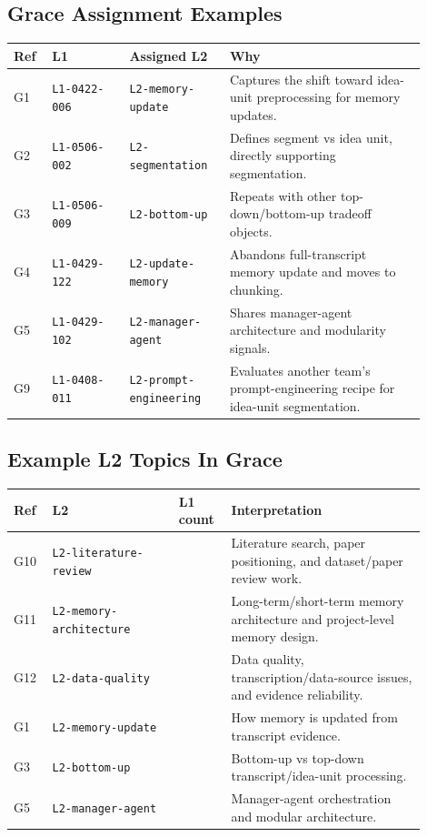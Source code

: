 \documentclass[11pt,a4paper]{article}
\newcommand{\code}[1]{{\footnotesize\texttt{#1}}}
\begin{document}
\subsection{Grace Assignment Examples}

\begin{longtable}{>{\raggedright\arraybackslash}p{0.08\linewidth}>{\raggedright\arraybackslash}p{0.17\linewidth}>{\raggedright\arraybackslash}p{0.22\linewidth}>{\raggedright\arraybackslash}p{0.43\linewidth}}
\textbf{Ref} & \textbf{L1} & \textbf{Assigned L2} & \textbf{Why} \\
\hline
G1 & \code{L1-0422-006} & \code{L2-memory-update} & Captures the shift toward idea-unit preprocessing for memory updates. \\
G2 & \code{L1-0506-002} & \code{L2-segmentation} & Defines segment vs idea unit, directly supporting segmentation. \\
G3 & \code{L1-0506-009} & \code{L2-bottom-up} & Repeats with other top-down/bottom-up tradeoff objects. \\
G4 & \code{L1-0429-122} & \code{L2-update-memory} & Abandons full-transcript memory update and moves to chunking. \\
G5 & \code{L1-0429-102} & \code{L2-manager-agent} & Shares manager-agent architecture and modularity signals. \\
G9 & \code{L1-0408-011} & \code{L2-prompt-engineering} & Evaluates another team's prompt-engineering recipe for idea-unit segmentation. \\
\end{longtable}

\subsection{Example L2 Topics In Grace}

\begin{longtable}{>{\raggedright\arraybackslash}p{0.08\linewidth}>{\raggedright\arraybackslash}p{0.28\linewidth}>{\raggedleft\arraybackslash}p{0.11\linewidth}>{\raggedright\arraybackslash}p{0.43\linewidth}}
\textbf{Ref} & \textbf{L2} & \textbf{L1 count} & \textbf{Interpretation} \\
\hline
G10 & \code{L2-literature-review} & 26 & Literature search, paper positioning, and dataset/paper review work. \\
G11 & \code{L2-memory-architecture} & 25 & Long-term/short-term memory architecture and project-level memory design. \\
G12 & \code{L2-data-quality} & 21 & Data quality, transcription/data-source issues, and evidence reliability. \\
G1 & \code{L2-memory-update} & 15 & How memory is updated from transcript evidence. \\
G3 & \code{L2-bottom-up} & 12 & Bottom-up vs top-down transcript/idea-unit processing. \\
G5 & \code{L2-manager-agent} & 12 & Manager-agent orchestration and modular architecture. \\
\end{longtable}
\end{document}
